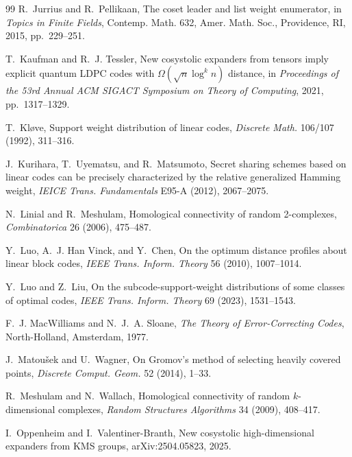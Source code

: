 \documentclass[11pt,letterpaper]{article}
\theoremstyle{plain}
\theoremstyle{definition}
\newcommand{\1}{\mathbf{1}}
\begin{document}
\begin{thebibliography}{99}
R.~Jurrius and R.~Pellikaan,
\newblock The coset leader and list weight enumerator,
\newblock in \emph{Topics in Finite Fields}, Contemp. Math. 632,
Amer. Math. Soc., Providence, RI, 2015, pp.~229--251.

T.~Kaufman and R.~J. Tessler,
\newblock New cosystolic expanders from tensors imply explicit quantum LDPC codes with
$\Omega(\sqrt n\log^k n)$ distance,
\newblock in \emph{Proceedings of the 53rd Annual ACM SIGACT Symposium on Theory of
Computing}, 2021, pp.~1317--1329.

T.~Kl{\o}ve,
\newblock Support weight distribution of linear codes,
\newblock \emph{Discrete Math.} 106/107 (1992), 311--316.

J.~Kurihara, T.~Uyematsu, and R.~Matsumoto,
\newblock Secret sharing schemes based on linear codes can be precisely characterized by
the relative generalized Hamming weight,
\newblock \emph{IEICE Trans. Fundamentals} E95-A (2012), 2067--2075.

N.~Linial and R.~Meshulam,
\newblock Homological connectivity of random 2-complexes,
\newblock \emph{Combinatorica} 26 (2006), 475--487.

Y.~Luo, A.~J. Han Vinck, and Y.~Chen,
\newblock On the optimum distance profiles about linear block codes,
\newblock \emph{IEEE Trans. Inform. Theory} 56 (2010), 1007--1014.

Y.~Luo and Z.~Liu,
\newblock On the subcode-support-weight distributions of some classes of optimal codes,
\newblock \emph{IEEE Trans. Inform. Theory} 69 (2023), 1531--1543.

F.~J. MacWilliams and N.~J.~A. Sloane,
\newblock \emph{The Theory of Error-Correcting Codes},
\newblock North-Holland, Amsterdam, 1977.

J.~Matou\v{s}ek and U.~Wagner,
\newblock On Gromov's method of selecting heavily covered points,
\newblock \emph{Discrete Comput. Geom.} 52 (2014), 1--33.

R.~Meshulam and N.~Wallach,
\newblock Homological connectivity of random $k$-dimensional complexes,
\newblock \emph{Random Structures Algorithms} 34 (2009), 408--417.

I.~Oppenheim and I.~Valentiner-Branth,
\newblock New cosystolic high-dimensional expanders from KMS groups,
\newblock arXiv:2504.05823, 2025.


\end{thebibliography}
\end{document}
